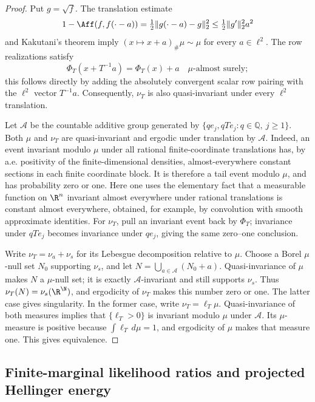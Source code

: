 \begin{proof}
Put \(g=\sqrt f\).  The translation estimate
\[
  1-\Aff(f,f(\cdot-a))
     =\tfrac12\|g(\cdot-a)-g\|_2^2
     \leq\tfrac12\|g'\|_2^2a^2
\]
and Kakutani's theorem imply
\((x\mapsto x+a)_\#\mu\sim\mu\) for every \(a\in\ell^2\).
The row realizations satisfy
\[
  \Phi_T(x+T^{-1}a)=\Phi_T(x)+a
  \quad\mu\text{-almost surely};
\]
this follows directly by adding the absolutely convergent scalar row
pairing with the \(\ell^2\) vector \(T^{-1}a\).
Consequently, \(\nu_T\) is also quasi-invariant under every
\(\ell^2\) translation.

Let \(\mathcal A\) be the countable additive group generated by
\(\{qe_j,qTe_j:q\in\mathbb Q,\ j\geq1\}\).
Both \(\mu\) and \(\nu_T\) are quasi-invariant and ergodic under
translation by \(\mathcal A\).  Indeed, an event invariant modulo \(\mu\) under
all rational finite-coordinate translations has, by a.e. positivity of the
finite-dimensional densities, almost-everywhere constant sections in each
finite coordinate block.  It is therefore a tail event modulo \(\mu\),
and has probability zero or one.  Here one uses the elementary fact that
a measurable function on \(\R^n\) invariant almost everywhere
under rational translations is constant almost everywhere, obtained, for
example, by convolution with smooth approximate identities.
For \(\nu_T\), pull an invariant event back by \(\Phi_T\); invariance
under \(qTe_j\) becomes invariance under \(qe_j\), giving the same
zero--one conclusion.

Write \(\nu_T=\nu_a+\nu_s\) for its Lebesgue decomposition relative to
\(\mu\).  Choose a Borel \(\mu\)-null set \(N_0\) supporting
\(\nu_s\), and let \(N=\bigcup_{a\in\mathcal A}(N_0+a)\).
Quasi-invariance of \(\mu\) makes \(N\) a \(\mu\)-null set;
it is exactly \(\mathcal A\)-invariant and still supports \(\nu_s\).
Thus \(\nu_T(N)=\nu_s(\R^{\N})\), and ergodicity of \(\nu_T\) makes this
number zero or one.  The latter case gives singularity.  In the former
case, write \(\nu_T=\ell_T\mu\).  Quasi-invariance of both measures implies
that \(\{\ell_T>0\}\) is invariant modulo \(\mu\) under \(\mathcal A\).
Its \(\mu\)-measure is positive because \(\int \ell_T\,d\mu=1\), and
ergodicity of \(\mu\) makes that measure one.  This gives equivalence.
\end{proof}

\subsection{Finite-marginal likelihood ratios and projected Hellinger energy}
\label{sec:finite-marginal-likelihood-ratios}

